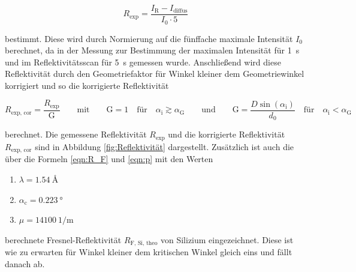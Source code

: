     \begin{equation*}
      R_{\text{exp}} = \frac{I_{\text{R}} - I_{\text{diffus}}}{I_0 \cdot 5}
    \end{equation*}
    
    bestimmt. Diese wird durch Normierung auf die fünffache maximale Intensität $I_0$ berechnet, da in der Messung zur Bestimmung der maximalen Intensität für \SI{1}{\second} und im Reflektivitätsscan für
    \SI{5}{\second} gemessen wurde. Anschließend wird diese Reflektivität durch den Geometriefaktor für Winkel kleiner dem Geometriewinkel korrigiert und so die korrigierte Reflektivität

    \begin{equation*}
      R_{\text{exp, cor}} = \frac{R_{\text{exp}}}{\text{G}} \qquad \text{mit} \qquad \text{G}=1 \quad \text{für} \quad \alpha_{\text{i}} \gtrsim \alpha_{\text{G}} \qquad \text{und} \qquad \text{G}=\frac{D\sin\left(\alpha_{\text{i}}\right)}{d_0} \quad \text{für} \quad \alpha_{\text{i}} < \alpha_{\text{G}}
    \end{equation*}

    berechnet. Die gemessene Reflektivität $R_{\text{exp}}$ und die korrigierte Reflektivität $R_{\text{exp, cor}}$ sind in Abbildung \ref{fig:Reflektivität} dargestellt. Zusätzlich ist auch die über die 
    Formeln \ref{eqn:R_F} und \ref{eqn:p} mit den Werten

    \begin{enumerate}
      \item $\lambda = \SI{1.54}{\angstrom}$
      \item $\alpha_{\text{c}} = \SI{0.223}{\degree}$
      \item $\mu = \SI{14100}{1\per\metre}$
    \end{enumerate}

    berechnete Fresnel-Reflektivität $R_{\text{F, Si, theo}}$ von Silizium eingezeichnet. Diese ist wie zu erwarten für Winkel kleiner dem kritischen Winkel gleich eins und fällt danach ab.

